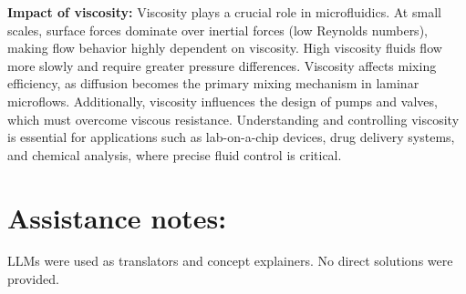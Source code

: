 \documentclass[11pt]{article}
\begin{document}
\textbf{Impact of viscosity:} Viscosity plays a crucial role in microfluidics. At small scales, surface forces dominate over inertial forces (low Reynolds numbers), making flow behavior highly dependent on viscosity. High viscosity fluids flow more slowly and require greater pressure differences. Viscosity affects mixing efficiency, as diffusion becomes the primary mixing mechanism in laminar microflows. Additionally, viscosity influences the design of pumps and valves, which must overcome viscous resistance. Understanding and controlling viscosity is essential for applications such as lab-on-a-chip devices, drug delivery systems, and chemical analysis, where precise fluid control is critical.

\section*{Assistance notes:} LLMs were used as translators and concept explainers. No direct solutions were provided.
\end{document}
